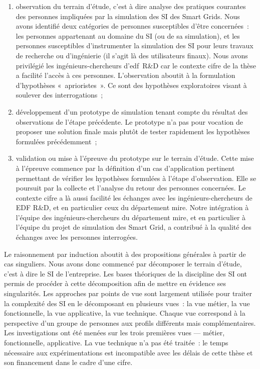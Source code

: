 \begin{enumerate}
	\item observation du terrain d'étude, c'est à dire analyse des pratiques 
courantes des personnes impliquées par la simulation des SI des Smart Grids. Nous avons identifié deux 
catégories de personnes susceptibles d'être concernées~: les personnes appartenant au domaine du SI (ou 
de sa simulation), et les personnes susceptibles d'instrumenter la simulation des SI 
pour leurs travaux de recherche ou d'ingénierie (il s'agit là des utilisateurs 
finaux). Nous avons privilégié les ingénieurs-chercheurs d'\gls{edf}~R\&D car le 
contexte \gls{cifre} de la thèse a facilité l'accès à ces 
personnes. L'observation aboutit à la formulation d'hypothèses «~aprioristes~». 
Ce sont des hypothèses exploratoires visant à soulever des interrogations~;

	
	\item développement d'un prototype de simulation tenant compte du résultat des 
observations de l'étape précédente. Le prototype n'a pas pour vocation de 
proposer une solution finale mais plutôt de tester rapidement les hypothèses 
formulées précédemment~;
	
	\item validation ou mise à l'épreuve du prototype sur le terrain d'étude. Cette 
mise à l'épreuve commence par la définition d'un cas d'application pertinent 
permettant de vérifier les hypothèses formulées à l'étape d'observation. Elle se 
poursuit par la collecte et l'analyse du retour des personnes concernées. Le 
contexte \gls{cifre} a là aussi facilité les échanges avec les 
ingénieurs-chercheurs de EDF R\&D, et en particulier ceux du département 
\gls{mire}. Notre intégration à l'équipe des ingénieurs-chercheurs du département 
\gls{mire}, et en particulier à l'équipe du projet de simulation des Smart Grid, 
a contribué à la qualité des échanges avec les personnes interrogées.
	
\end{enumerate}
		
Le raisonnement par induction aboutit à des propositions générales à partir de 
cas singuliers. Nous avons donc commencé par décomposer le terrain d'étude, 
c'est à dire le SI de l'entreprise. Les bases théoriques de la discipline des SI 
ont permis de procéder à cette décomposition afin de mettre en évidence ses 
singularités. Les approches par points de vue sont largement utilisée pour 
traiter la complexité des SI en le décomposant en plusieurs vues~: la vue 
métier, la vue fonctionnelle, la vue applicative, la vue technique. Chaque vue 
correspond à la perspective d'un groupe de personnes aux profils différents mais 
complémentaires. Les investigations ont été menées sur les trois premières vues — 
métier, fonctionnelle, applicative. La vue technique n'a pas été traitée~: le 
temps nécessaire aux expérimentations est incompatible avec les délais de cette 
thèse et son financement dans le cadre d'une \gls{cifre}.
	
